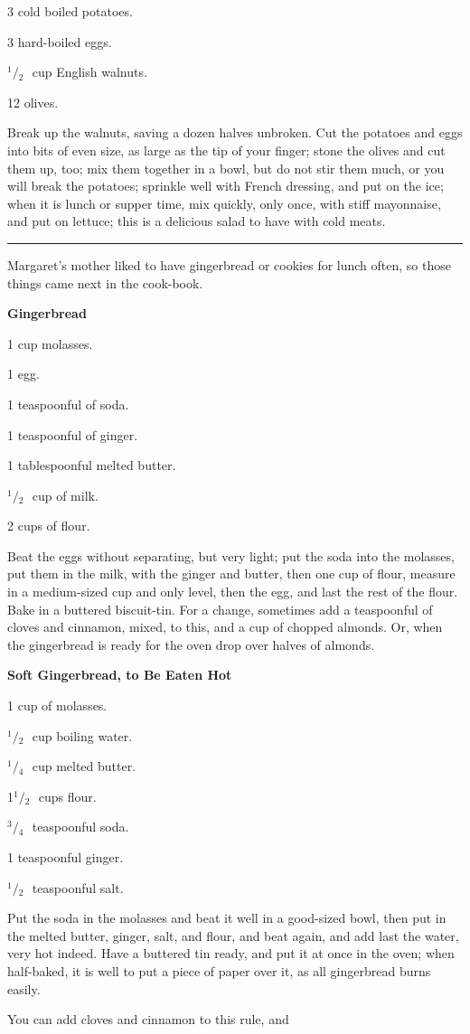 \documentclass[11pt]{book}
\newcommand{\hstroke}{\rule[0.5ex]{5.0em}{0.2ex}}
\newcommand{\indpar}{\par\noindent\hspace*{\parindent}}
\newcommand{\ingredient}{\indpar}
\newcommand{\instruction}{\indpar}
\newcommand{\OneHalf}{\ensuremath{{}^1\!\!/\!{}_2\mbox{\ }}}
\newcommand{\OneQuarter}{\ensuremath{{}^1\!\!/\!{}_4\mbox{\ }}}
\newcommand{\ThreeQuarters}{\ensuremath{{}^3\!\!/\!{}_4\mbox{\ }}}
\newenvironment{RecipeTitle}{\medskip\begin{center}\large\bf }{\end{center}\smallskip}
\begin{document}
\ingredient  3 cold boiled potatoes.
\ingredient  3 hard-boiled eggs.
\ingredient  \OneHalf cup English walnuts.
\ingredient  12 olives.
\instruction
  Break up the walnuts, saving a dozen halves unbroken.
Cut the potatoes and eggs into bits of even size, as large
as the tip of your finger; stone the olives and cut them up,
too; mix them together in a bowl, but do not stir them much,
or you will break the potatoes; sprinkle well with French
dressing, and put on the ice; when it is lunch or supper
time, mix quickly, only once, with stiff mayonnaise, and put
on lettuce; this is a delicious salad to have with cold meats.
\smallskip
\begin{center}
\hstroke
\end{center}
\medskip
\indpar
  Margaret's mother liked to have gingerbread or cookies for
lunch often, so those things came next in the cook-book.
\begin{RecipeTitle}
Gingerbread\label{gingerbread}
\end{RecipeTitle}
\ingredient  1 cup molasses.
\ingredient  1 egg.
\ingredient  1 teaspoonful of soda.
\ingredient  1 teaspoonful of ginger.
\ingredient  1 tablespoonful melted butter.
\ingredient  \OneHalf cup of milk.
\ingredient  2 cups of flour.
\instruction
  Beat the eggs without separating, but very light; put the
soda into the molasses, put them in the milk, with the ginger
and butter, then one cup of flour, measure in a medium-sized
cup and only level, then the egg, and last the rest of the
flour.  Bake in a buttered biscuit-tin.  For a change,
sometimes add a teaspoonful of cloves and cinnamon, mixed,
to this, and a cup of chopped almonds.  Or, when the
gingerbread is ready for the oven drop over halves of almonds.
\begin{RecipeTitle}
Soft Gingerbread, to Be Eaten Hot\label{soft_gingerbread}
\end{RecipeTitle}
\ingredient  1 cup of molasses.
\ingredient  \OneHalf cup boiling water.
\ingredient  \OneQuarter cup melted butter.
\ingredient  1\OneHalf cups flour.
\ingredient  \ThreeQuarters teaspoonful soda.
\ingredient  1 teaspoonful ginger.
\ingredient  \OneHalf teaspoonful salt.
\instruction
  Put the soda in the molasses and beat it well in a
good-sized bowl, then put in the melted butter, ginger,
salt, and flour, and beat again, and add last the water,
very hot indeed.  Have a buttered tin ready, and put it at
once in the oven; when half-baked, it is well to put a
piece of paper over it, as all gingerbread burns easily.
\instruction
  You can add cloves and cinnamon to this rule, and
\end{document}
